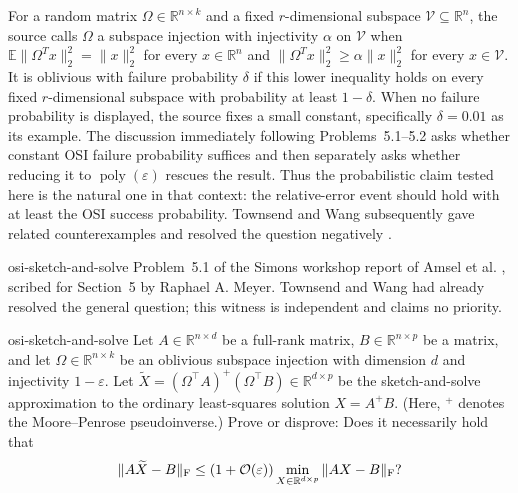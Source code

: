 
\begin{cxcredits}
\end{cxcredits}

\begin{cxcontext}
For a random matrix $\Omega\in\mathbb R^{n\times k}$ and a fixed
$r$-dimensional subspace $\mathcal V\subseteq\mathbb R^n$, the source calls
$\Omega$ a subspace injection with injectivity $\alpha$ on $\mathcal V$ when
$\mathbb E\|\Omega^Tx\|_2^2=\|x\|_2^2$ for every $x\in\mathbb R^n$ and
$\|\Omega^Tx\|_2^2\geq\alpha\|x\|_2^2$ for every $x\in\mathcal V$.
It is oblivious with failure probability $\delta$ if this lower inequality
holds on every fixed $r$-dimensional subspace with probability at least
$1-\delta$.  When no failure probability is displayed, the source fixes a
small constant, specifically $\delta=0.01$ as its example.  The discussion
immediately following Problems~5.1--5.2 asks whether constant OSI failure
probability suffices and then separately asks whether reducing it to
$\operatorname{poly}(\varepsilon)$ rescues the result.  Thus the probabilistic
claim tested here is the natural one in that context: the relative-error event
should hold with at least the OSI success probability.  Townsend and Wang
subsequently gave related counterexamples and resolved the question negatively
\cite{TownsendWang2026}.
\end{cxcontext}

\begin{cxsource}{osi-sketch-and-solve}
Problem~5.1 of the Simons workshop report of Amsel et al.
\cite{AmselEtAl2026}, scribed for Section~5 by Raphael A. Meyer.  Townsend and
Wang \cite{TownsendWang2026} had already resolved the general question; this
witness is independent and claims no priority.
\end{cxsource}

\begin{cxstatement}{osi-sketch-and-solve}
Let $A\in\mathbb{R}^{n\times d}$ be a full-rank matrix,
$B\in\mathbb{R}^{n\times p}$ be a matrix, and let
$\Omega\in\mathbb{R}^{n\times k}$ be an oblivious subspace injection with
dimension $d$ and injectivity $1-\varepsilon$. Let
$\widetilde{X}=(\Omega^{\top}A)^{+}(\Omega^{\top}B)\in\mathbb{R}^{d\times p}$
be the sketch-and-solve approximation to the ordinary least-squares solution
$X=A^{+}B$. (Here, ${}^{+}$ denotes the Moore--Penrose pseudoinverse.) Prove
or disprove: Does it necessarily hold that
\[
\|A\widetilde{X}-B\|_{\rm F}\leq(1+\mathcal{O}(\varepsilon))
\min_{X\in\mathbb{R}^{d\times p}}\|AX-B\|_{\rm F}?
\]
\end{cxstatement}

